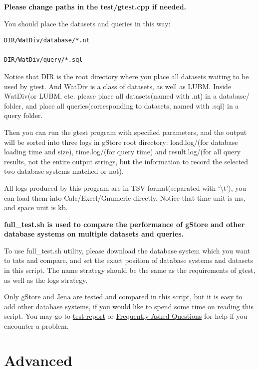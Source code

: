 \documentclass[titlepage, a4paper, 12pt]{article}
\begin{document}
\textbf{Please change paths in the test/gtest.cpp if needed.}

You should place the datasets and queries in this way:

\begin{verbatim}
DIR/WatDiv/database/*.nt

DIR/WatDiv/query/*.sql
\end{verbatim}

Notice that DIR is the root directory where you place all datasets
waiting to be used by gtest. And WatDiv is a class of datasets, as well
as LUBM. Inside WatDiv(or LUBM, etc. please place all datasets(named
with .nt) in a database/ folder, and place all queries(corresponding to
datasets, named with .sql) in a query folder.

Then you can run the gtest program with specified parameters, and the
output will be sorted into three logs in gStore root directory:
load.log/(for database loading time and size), time.log/(for query time)
and result.log/(for all query results, not the entire output strings,
but the information to record the selected two database systems matched
or not).

All logs produced by this program are in TSV format(separated with
`\textbackslash{}t'), you can load them into Calc/Excel/Gnumeric
directly. Notice that time unit is ms, and space unit is kb.

\textbf{full\_test.sh is used to compare the performance of gStore and
other database systems on multiple datasets and queries.}

To use full\_test.sh utility, please download the database system which
you want to tats and compare, and set the exact position of database
systems and datasets in this script. The name strategy should be the
same as the requirements of gtest, as well as the logs strategy.

Only gStore and Jena are tested and compared in this script, but it is
easy to add other database systems, if you would like to spend some time
on reading this script. You may go to
\href{run:../pdf/gstore���Ա���.pdf}{test
report} or \hyperref[chapter10]{Frequently Asked Questions} for help if
you encounter a problem.

\clearpage

\part{Advanced}

\end{document}
